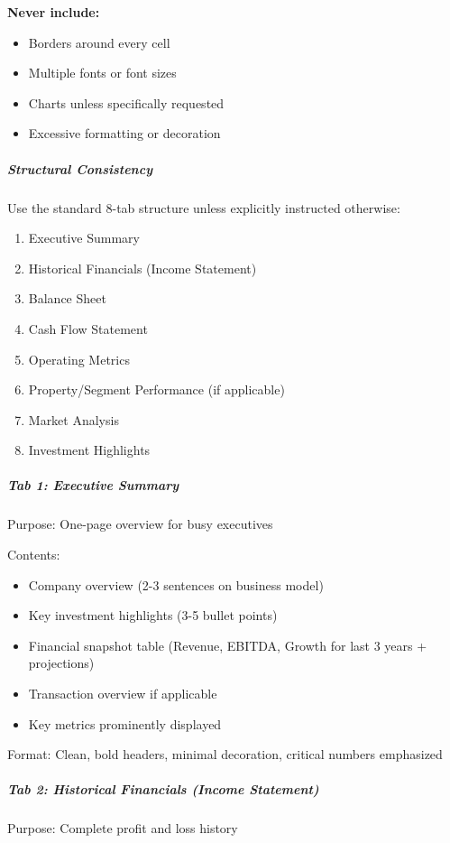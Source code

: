\documentclass[11pt]{article}
\begin{document}
\textbf{Never include:}

\begin{itemize}[leftmargin=*,itemsep=2pt,topsep=2pt]
\item {} Borders around every cell
\item {} Multiple fonts or font sizes
\item {} Charts unless specifically requested
\item {} Excessive formatting or decoration
\end{itemize}

\subparagraph{Structural Consistency}\mbox{}\par
Use the standard 8-tab structure unless explicitly instructed otherwise:

\begin{enumerate}[leftmargin=*,itemsep=2pt,topsep=2pt]
\item {} Executive Summary
\item {} Historical Financials (Income Statement)
\item {} Balance Sheet
\item {} Cash Flow Statement
\item {} Operating Metrics
\item {} Property/Segment Performance (if applicable)
\item {} Market Analysis
\item {} Investment Highlights
\end{enumerate}

\subparagraph{Tab 1: Executive Summary}\mbox{}\par
Purpose: One-page overview for busy executives


Contents:

\begin{itemize}[leftmargin=*,itemsep=2pt,topsep=2pt]
\item {} Company overview (2-3 sentences on business model)
\item {} Key investment highlights (3-5 bullet points)
\item {} Financial snapshot table (Revenue, EBITDA, Growth for last 3 years + projections)
\item {} Transaction overview if applicable
\item {} Key metrics prominently displayed
\end{itemize}

Format: Clean, bold headers, minimal decoration, critical numbers emphasized


\subparagraph{Tab 2: Historical Financials (Income Statement)}\mbox{}\par
Purpose: Complete profit and loss history
\end{document}
